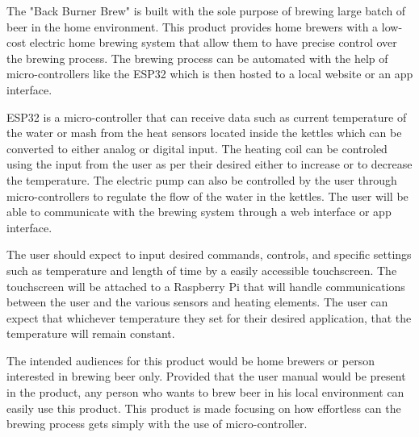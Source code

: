 The "Back Burner Brew" is built with the sole purpose of brewing large batch of beer in the home environment. This product provides home brewers with a low-cost electric home brewing system that allow them to have precise control over the brewing process. The brewing process can be automated with the help of micro-controllers like the ESP32 which is then hosted to a local website or an app interface.

ESP32 is a micro-controller that can receive data such as current temperature of the water or mash from the heat sensors located inside the kettles which can be converted to either analog or digital input. The heating coil can be controled using the input from the user as per their desired either to increase or to decrease the temperature. The electric pump can also be controlled by the user through micro-controllers to regulate the flow of the water in the kettles. The user will be able to communicate with the brewing system through a web interface or app interface.

The user should expect to input desired commands, controls, and specific
settings such as temperature and length of time by a easily accessible
touchscreen. The touchscreen will be attached to a Raspberry Pi that will handle
communications between the user and the various sensors and heating elements.
The user can expect that whichever temperature they set for their desired
application, that the temperature will remain constant.

The intended audiences for this product would be home brewers or person interested in brewing beer only. Provided that the user manual would be present in the product, any person who wants to brew beer in his local environment can easily use this product. This product is made focusing on how effortless can the brewing process gets simply with the use of micro-controller.